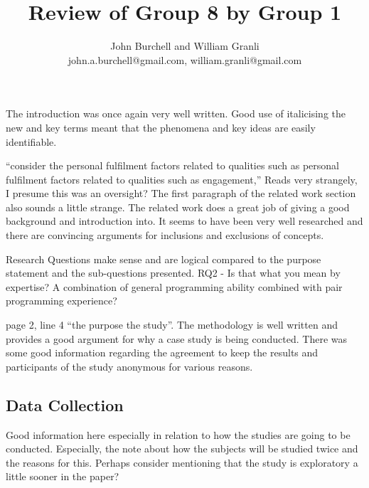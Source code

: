 \documentclass[times, 10pt,twocolumn]{article}
\begin{document}
\title{Review of Group 8 by Group 1}

\author{John Burchell and William Granli \\
john.a.burchell@gmail.com, william.granli@gmail.com}



\maketitle
\thispagestyle{empty}





The introduction was once again very well written. Good use of italicising the new and key terms meant that the phenomena and key ideas are easily identifiable. 

``consider the personal fulfilment factors related to qualities such as personal fulfilment factors related to qualities such as engagement,'' Reads very strangely, I presume this was an oversight? The first paragraph of the related work section also sounds a little strange. The related work does a great job of giving a good background and introduction into. It seems to have been very well researched and there are convincing arguments for inclusions and exclusions of concepts.

Research Questions make sense and are logical compared to the purpose statement and the sub-questions presented.
RQ2 - Is that what you mean by expertise? A combination of general programming ability combined with pair programming experience?

page 2, line 4 ``the purpose the study''.
The methodology is well written and provides a good argument for why a case study is being conducted. There was some good information regarding the agreement to keep the results and participants of the study anonymous for various reasons.

\subsection{Data Collection}
Good information here especially in relation to how the studies are going to be conducted. Especially, the note about how the subjects will be studied twice and the reasons for this. Perhaps consider mentioning that the study is exploratory a little sooner in the paper?
\end{document}
